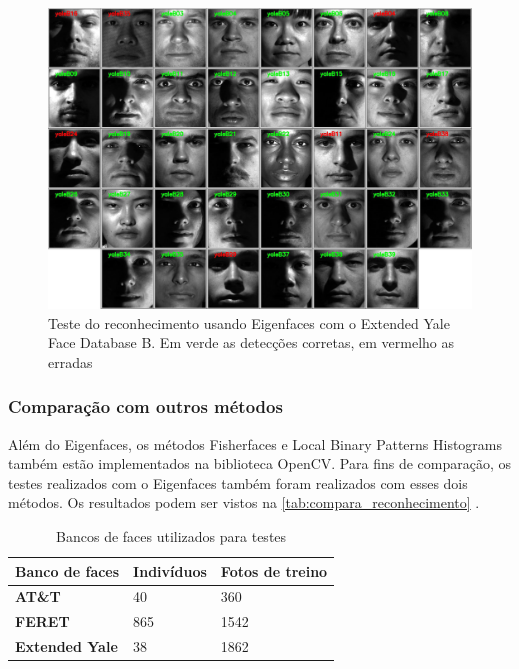 \begin{figure}[htbp]
    \centering
    \caption[Teste do algoritmo Eigenfaces - Yale]{Teste do reconhecimento usando Eigenfaces com o Extended Yale Face Database B. Em verde as detecções corretas, em vermelho as erradas}
    \label{fig:eigenfaces_resultado_yale}
    \includegraphics[width=0.95\linewidth]{imagens/eigenfaces_resultado_yale.jpg}
\end{figure}


\subsubsection{Comparação com outros métodos}\label{sec:eigenfaces_comparacao}

Além do Eigenfaces, os métodos Fisherfaces e Local Binary Patterns Histograms também estão implementados na biblioteca OpenCV. Para fins de comparação, os testes realizados com o Eigenfaces também foram realizados com esses dois métodos. Os resultados podem ser vistos na \autoref{tab:compara_reconhecimento} \footnotemark.

\begin{table}[htpb]
\centering
\caption{Bancos de faces utilizados para testes}
\label{tab:bancos_faces}
\begin{tabular}{|l|l|l|}
\hline
\textbf{Banco de faces} & \textbf{Indivíduos} & \textbf{Fotos de treino} \\\hline
\textbf{AT\&T}          & 40                  & 360                      \\\hline
\textbf{FERET}          & 865                 & 1542                     \\\hline
\textbf{Extended Yale}  & 38                  & 1862                     \\\hline
\end{tabular}
\end{table}

